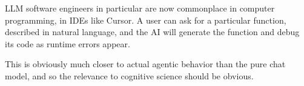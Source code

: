 LLM software engineers in particular are now commonplace in computer
programming, in IDEs like Cursor. A user can ask for a particular function,
described in natural language, and the AI will generate the function and debug
its code as runtime errors appear.

This is obviously much closer to actual agentic behavior than the pure chat
model, and so the relevance to cognitive science should be obvious.



